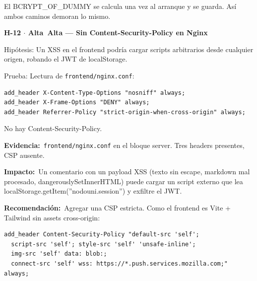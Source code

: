 \documentclass[10pt,a4paper]{article}
\newcommand{\code}[1]{\nolinkurl{#1}}
\newcommand{\badgeAlta}{\colorbox{orange!20}{\textcolor{orange!90!black}{\textbf{\footnotesize Alta}}}}
\begin{document}
El BCRYPT\_OF\_DUMMY se calcula una vez al arranque y se guarda. Así ambos caminos demoran lo mismo.\par\vspace{0.4em}
\vspace{0.8em}\noindent\textbf{\large H-12 $\cdot$ \badgeAlta\  Alta --- Sin Content-Security-Policy en Nginx}\par\vspace{0.3em}
Hipótesis: Un XSS en el frontend podría cargar scripts arbitrarios desde cualquier origen, robando el JWT de localStorage.\par\vspace{0.4em}
Prueba: Lectura de \code{frontend/nginx.conf}:\par\vspace{0.4em}
\begin{tcolorbox}[colback=codebg,colframe=gray!40,arc=1mm]\small
\begin{verbatim}
add_header X-Content-Type-Options "nosniff" always;
add_header X-Frame-Options "DENY" always;
add_header Referrer-Policy "strict-origin-when-cross-origin" always;
\end{verbatim}
\end{tcolorbox}\vspace{0.4em}
No hay Content-Security-Policy.\par\vspace{0.4em}
\noindent\textbf{Evidencia:}\ \code{frontend/nginx.conf} en el bloque server. Tres headers presentes, CSP ausente.\par\vspace{0.4em}
\noindent\textbf{Impacto:}\ Un comentario con un payload XSS (texto sin escape, markdown mal procesado, dangerouslySetInnerHTML) puede cargar un script externo que lea localStorage.getItem(''nodouni.session'') y exfiltre el JWT.\par\vspace{0.4em}
\noindent\textbf{Recomendación:}\ Agregar una CSP estricta. Como el frontend es Vite + Tailwind sin assets cross-origin:\par\vspace{0.4em}
\begin{tcolorbox}[colback=codebg,colframe=gray!40,arc=1mm]\small
\begin{verbatim}
add_header Content-Security-Policy "default-src 'self'; 
  script-src 'self'; style-src 'self' 'unsafe-inline'; 
  img-src 'self' data: blob:; 
  connect-src 'self' wss: https://*.push.services.mozilla.com;" always;
\end{verbatim}
\end{tcolorbox}\vspace{0.4em}
\end{document}
